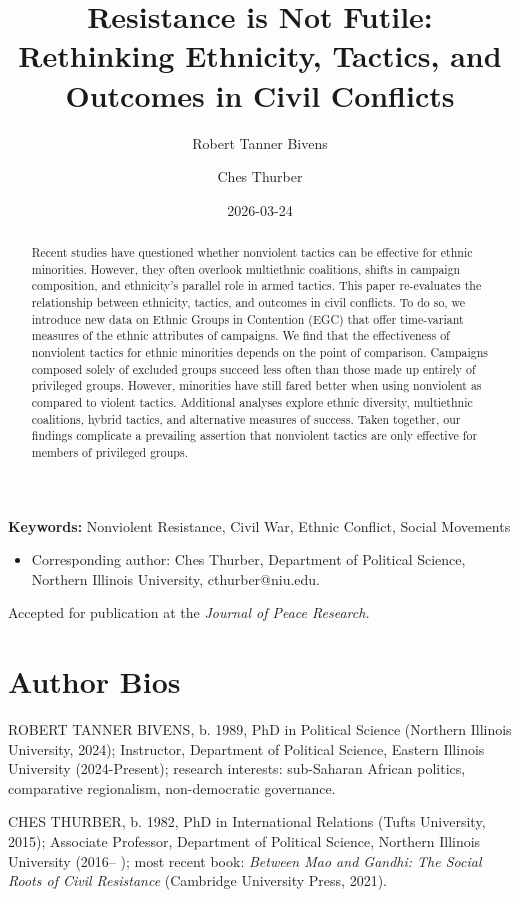 \documentclass[
  letterpaper,
  DIV=11,
  numbers=noendperiod]{scrartcl}
\title{Resistance is Not Futile: Rethinking Ethnicity, Tactics, and
Outcomes in Civil Conflicts}
\author{Robert Tanner Bivens \and Ches Thurber}
\date{2026-03-24}
\providecommand{\tightlist}{%
  \setlength{\itemsep}{0pt}\setlength{\parskip}{0pt}}\usepackage{longtable,booktabs,array}
\begin{document}
\maketitle
\begin{abstract}
Recent studies have questioned whether nonviolent tactics can be
effective for ethnic minorities. However, they often overlook
multiethnic coalitions, shifts in campaign composition, and ethnicity's
parallel role in armed tactics. This paper re-evaluates the relationship
between ethnicity, tactics, and outcomes in civil conflicts. To do so,
we introduce new data on Ethnic Groups in Contention (EGC) that offer
time-variant measures of the ethnic attributes of campaigns. We find
that the effectiveness of nonviolent tactics for ethnic minorities
depends on the point of comparison. Campaigns composed solely of
excluded groups succeed less often than those made up entirely of
privileged groups. However, minorities have still fared better when
using nonviolent as compared to violent tactics. Additional analyses
explore ethnic diversity, multiethnic coalitions, hybrid tactics, and
alternative measures of success. Taken together, our findings complicate
a prevailing assertion that nonviolent tactics are only effective for
members of privileged groups.
\end{abstract}


\textbf{Keywords:} Nonviolent Resistance, Civil War, Ethnic Conflict,
Social Movements

\begin{itemize}
\tightlist
\item
  Corresponding author: Ches Thurber, Department of Political Science,
  Northern Illinois University, cthurber@niu.edu.
\end{itemize}

Accepted for publication at the \emph{Journal of Peace Research.}

\section{Author Bios}\label{author-bios}

ROBERT TANNER BIVENS, b. 1989, PhD in Political Science (Northern
Illinois University, 2024); Instructor, Department of Political Science,
Eastern Illinois University (2024-Present); research interests:
sub-Saharan African politics, comparative regionalism, non-democratic
governance.

CHES THURBER, b. 1982, PhD in International Relations (Tufts University,
2015); Associate Professor, Department of Political Science, Northern
Illinois University (2016-- ); most recent book: \emph{Between Mao and
Gandhi: The Social Roots of Civil Resistance} (Cambridge University
Press, 2021).
\end{document}
